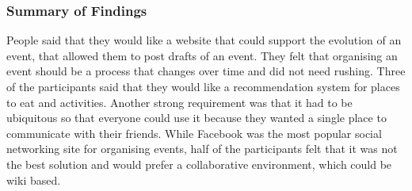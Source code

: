 \documentclass{sigchi}
\begin{document}
\subsubsection{Summary of Findings}
People said that they would like a website that could support the evolution of an event, that allowed them to post drafts of an event.  They felt that organising an event should be a process that changes over time and did not need rushing.  Three of the participants said that they would like a recommendation system for places to eat and activities. Another strong requirement was that it had to be ubiquitous so that everyone could use it because they wanted a single place to communicate with their friends.  While Facebook was the most popular social networking site for organising events, half of the participants felt that it was not the best solution and would prefer a collaborative environment, which could be wiki based.
\end{document}

